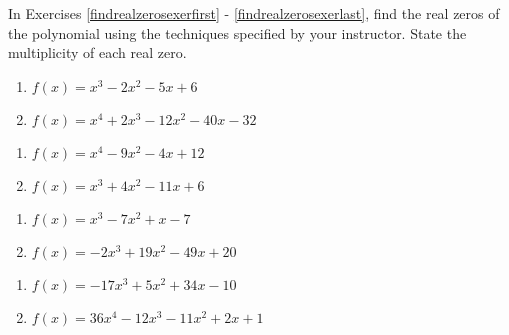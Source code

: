 In Exercises \ref{findrealzerosexerfirst} - \ref{findrealzerosexerlast}, find the real zeros of the polynomial using the techniques specified by your instructor.  State the multiplicity of each real zero.


\begin{multicols}{2}
\begin{enumerate}
\setcounter{enumi}{\value{HW}}

\item $f(x) = x^{3} - 2x^{2} - 5x + 6$ \label{findrealzerosexerfirst}
\item $f(x) = x^{4} + 2x^{3} - 12x^{2} - 40x - 32$

\setcounter{HW}{\value{enumi}}
\end{enumerate}
\end{multicols}

\begin{multicols}{2}
\begin{enumerate}
\setcounter{enumi}{\value{HW}}

\item $f(x) = x^{4} - 9x^{2} - 4x + 12$
\item $f(x) = x^{3} + 4x^{2} - 11x + 6$

\setcounter{HW}{\value{enumi}}
\end{enumerate}
\end{multicols}

\begin{multicols}{2}
\begin{enumerate}
\setcounter{enumi}{\value{HW}}

\item $f(x) = x^{3} - 7x^{2} + x - 7$
\item $f(x) = -2x^{3} + 19x^{2} - 49x + 20$

\setcounter{HW}{\value{enumi}}
\end{enumerate}
\end{multicols}

\begin{multicols}{2}
\begin{enumerate}
\setcounter{enumi}{\value{HW}}

\item $f(x) = -17x^{3} + 5x^{2} + 34x - 10$
\item $f(x) = 36x^{4} - 12x^{3} - 11x^{2} + 2x + 1$

\setcounter{HW}{\value{enumi}}
\end{enumerate}
\end{multicols}

